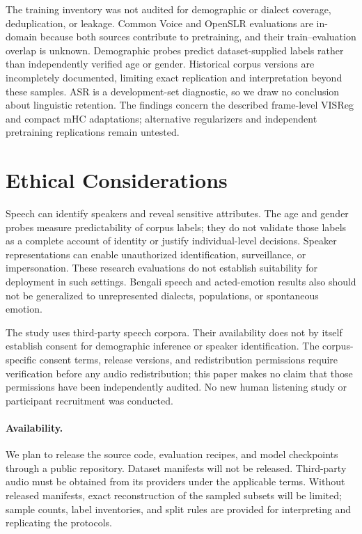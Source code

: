 \documentclass[11pt,a4paper]{article}
\begin{document}
The training inventory was not audited for demographic or dialect coverage, deduplication, or leakage. Common Voice and OpenSLR evaluations are in-domain because both sources contribute to pretraining, and their train--evaluation overlap is unknown. Demographic probes predict dataset-supplied labels rather than independently verified age or gender. Historical corpus versions are incompletely documented, limiting exact replication and interpretation beyond these samples. ASR is a development-set diagnostic, so we draw no conclusion about linguistic retention. The findings concern the described frame-level VISReg and compact mHC adaptations; alternative regularizers and independent pretraining replications remain untested.

\section{Ethical Considerations}

Speech can identify speakers and reveal sensitive attributes. The age and gender probes measure predictability of corpus labels; they do not validate those labels as a complete account of identity or justify individual-level decisions. Speaker representations can enable unauthorized identification, surveillance, or impersonation. These research evaluations do not establish suitability for deployment in such settings. Bengali speech and acted-emotion results also should not be generalized to unrepresented dialects, populations, or spontaneous emotion.

The study uses third-party speech corpora. Their availability does not by itself establish consent for demographic inference or speaker identification. The corpus-specific consent terms, release versions, and redistribution permissions require verification before any audio redistribution; this paper makes no claim that those permissions have been independently audited. No new human listening study or participant recruitment was conducted.

\paragraph{Availability.}
We plan to release the source code, evaluation recipes, and model checkpoints through a public repository. Dataset manifests will not be released. Third-party audio must be obtained from its providers under the applicable terms. Without released manifests, exact reconstruction of the sampled subsets will be limited; sample counts, label inventories, and split rules are provided for interpreting and replicating the protocols.
\end{document}
